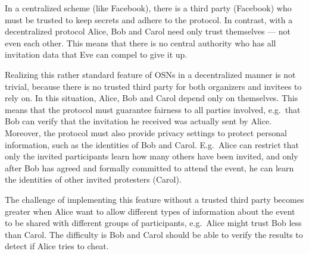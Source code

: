 In a centralized scheme (like Facebook), there is a third party (Facebook) who 
must be trusted to keep secrets and adhere to the protocol.
In contrast, with a decentralized protocol
Alice, Bob and Carol need only trust themselves --- not even each other.
This means that there is no central authority who has all invitation data that 
Eve can compel to give it up.

Realizing this rather standard feature of \acp{OSN} in a decentralized manner is not 
trivial, because there is no trusted third party for both organizers and 
invitees to rely on.
In this situation, Alice, Bob and Carol depend only on themselves.
This means that the protocol must guarantee fairness to all parties involved, 
e.g.\ that Bob can verify that the invitation he received was actually sent by 
Alice.
Moreover, the protocol must also provide privacy settings to protect personal 
information, such as the identities of Bob and Carol.
E.g.\ Alice can restrict that only the invited participants learn how many 
others have been invited, and only after Bob has agreed and formally committed 
to attend the event, he can learn the identities of other invited protesters 
(Carol).

The challenge of implementing this feature without a trusted third party 
becomes greater when Alice want to allow different types of information about 
the event to be shared with different groups of participants, e.g.\ Alice might 
trust Bob less than Carol.
The difficulty is Bob and Carol should be able to verify the results to detect 
if Alice tries to cheat.


